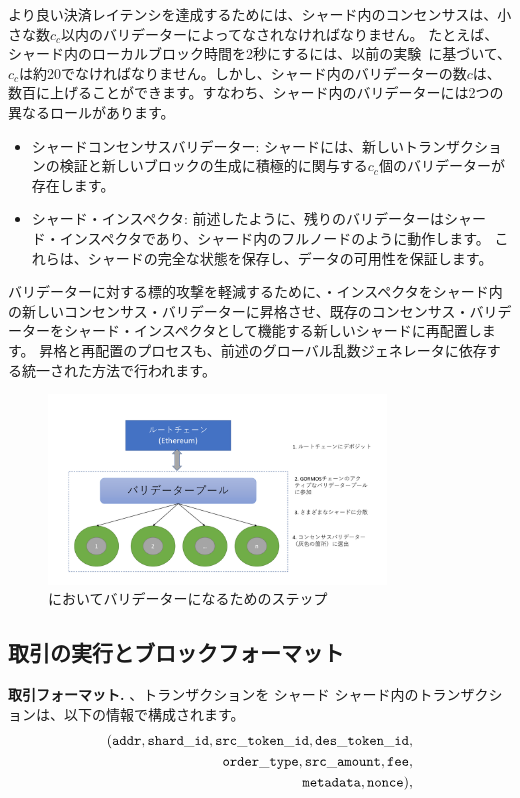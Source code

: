 より良い決済レイテンシを達成するためには、シャード内のコンセンサスは、小さな数$c_c$以内のバリデーターによってなされなければなりません。 たとえば、シャード内のローカルブロック時間を2秒にするには、以前の実験~\cite{elastico}に基づいて、$c_c$は約20でなければなりません。しかし、シャード内のバリデーターの数$c$は、数百に上げることができます。すなわち、シャード内のバリデーターには2つの異なるロールがあります。

\begin{itemize}
\item シャードコンセンサスバリデーター: シャードには、新しいトランザクションの検証と新しいブロックの生成に積極的に関与する$c_c$個のバリデーターが存在します。
\item シャード・インスペクタ: 前述したように、残りのバリデーターはシャード・インスペクタであり、シャード内のフルノードのように動作します。 これらは、シャードの完全な状態を保存し、データの可用性を保証します。
\end{itemize}

バリデーターに対する標的攻撃を軽減するために、・インスペクタをシャード内の新しいコンセンサス・バリデーターに昇格させ、既存のコンセンサス・バリデーターをシャード・インスペクタとして機能する新しいシャードに再配置します。 昇格と再配置のプロセスも、前述のグローバル乱数ジェネレータに依存する統一された方法で行われます。

\begin{figure}[t]
  \centering
  \includegraphics[width=0.8\textwidth]{images/validator}
  \caption{\codename においてバリデーターになるためのステップ}
  \label{fig:validator}
\end{figure}

\subsection{取引の実行とブロックフォーマット}

\textbf{取引フォーマット.} 、トランザクションを
シャード シャード内のトランザクションは、以下の情報で構成されます。
\begin{align*}
({\mathtt{addr}}, {\mathtt{shard\_id}}, {\mathtt{src\_token\_id}}, {\mathtt{des\_token\_id}}, \\ {\mathtt{order\_type}}, {\mathtt{src\_amount}}, {\mathtt{fee}}, \\ {\mathtt{metadata}}, {\mathtt{nonce}}),
\end{align*}

